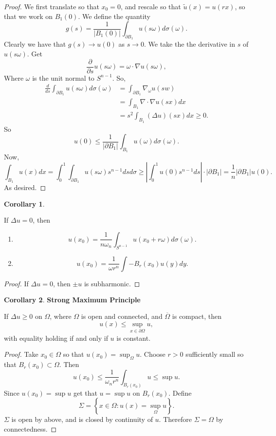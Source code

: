 \documentclass[12pt, a4paper]{article}
\theoremstyle{definition}
\newtheorem{cor}{Corollary}
\newcommand{\bd}{\partial}
\newcommand{\grad}{\nabla}
\newcommand{\ol}{\overline}
\begin{document}
\begin{proof}
	We first translate so that $x_0 = 0$, and rescale so that $\tilde{u}(x) = u(rx)$, so that we work on $B_1(0)$. We define the quantity 
	$$ g(s) = \frac{ 1 }{ |B_1(0)| } \int_{\bd B_1} u(s\omega) d \sigma(\omega). $$
	Clearly we have that $g(s) \to u(0)$ as $s \to 0$. We take the the derivative in $s$ of $u(s\omega)$. Get
	$$ \frac{ \partial  }{ \partial s } u(s \omega) = \omega \cdot \grad u (s\omega) , $$ 
Where $\omega$ is the unit normal to $S^{n-1}$. 
So,
\begin{align*}
	\frac{ d }{ ds } \int_{\bd B_1} u(s \omega ) d \sigma(\omega) & = \int_{\bd B_1} \grad_\omega u(sw) 
	\\ & = \int_{B_1} \grad \cdot \grad u(sx) dx \tag{Divergence Theorem}
	\\ &= s^2 \int_{B_1} \left( \Delta u \right) (sx) dx \geq 0.
\end{align*}
So 
	$$ u(0) \leq \frac{ 1 }{ |\bd B_1| } \int_{B_1} u(\omega) d \sigma(\omega). $$ 
Now, 
	$$ \int_{B_1} u(x) dx = \int_0^1 \int_{\bd B_1} u(s\omega) s^{n-1} ds d\sigma \geq \left| \int_0^1 u(0) s^{n-1} ds \right| \cdot |\bd B_1| = \frac{ 1 }{ n  } |\bd B_1| u(0). $$ 
As desired. 
\end{proof}
\begin{tcolorbox}
\begin{cor}
\end{cor}
If $\Delta u =0$, then 
\begin{enumerate}[label = \roman*)]
	\item $$ u(x_0) = \frac{ 1 }{ n \omega_n } \int_{S^{n-1}} u(x_0 + r \omega) d \sigma(\omega). $$
	\item  $$ u(x_0) = \frac{ 1 }{ \omega r^n } \int-{B_r(x_0)} u(y) dy. $$ 
\end{enumerate}
\end{tcolorbox}
\begin{proof}
If $\Delta u = 0$, then $\pm u$ is subharmonic.
\end{proof}
\begin{tcolorbox}
\begin{cor}
	\textbf{Strong Maximum Principle}
\end{cor}
	If $\Delta u \geq 0$ on $\Omega$, where $\Omega$ is open and connected, and $\ol{\Omega}$ is compact,  then 
	$$ u(x) \leq \sup_{x\in \bd \Omega} u, $$ 
	with equality holding if and only if $u$ is constant. 
\end{tcolorbox}
	\begin{proof}
		Take $x_0 \in \Omega$ so that $u(x_0) = \sup_\Omega u$. Choose $r>0$ sufficiently small so that $B_r(x_0) \subset \Omega$. Then
		$$ u(x_0) \leq \frac{ 1 }{ \omega_n r^n }\int_{B_r(x_0)} u \leq \sup u. $$ 
Since $u(x_0) = \sup u$ get that $u = \sup u$ on $B_r(x_0)$. Define
		$$ \Sigma = \left\{ x\in \Omega : u(x) = \sup_\Omega u \right\} .$$ 
		$\Sigma $ is open by above, and is closed by continuity of $u$. Therefore $\Sigma = \Omega$ by connectedness. 
	\end{proof}
\end{document}
